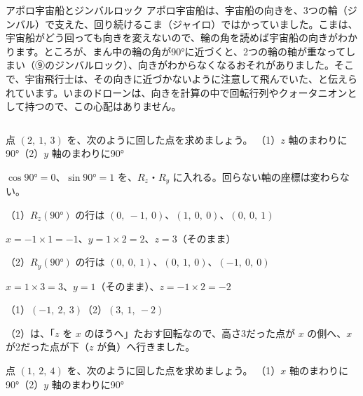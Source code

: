 \begin{column}{アポロ宇宙船とジンバルロック}
アポロ宇宙船は、宇宙船の向きを、3つの輪（ジンバル）で支えた、回り続けるこま（ジャイロ）ではかっていました。こまは、宇宙船がどう回っても向きを変えないので、輪の角を読めば宇宙船の向きがわかります。ところが、まん中の輪の角が90°に近づくと、2つの輪の軸が重なってしまい（⑨のジンバルロック）、向きがわからなくなるおそれがありました。そこで、宇宙飛行士は、その向きに近づかないように注意して飛んでいた、と伝えられています。いまのドローンは、向きを計算の中で回転行列やクォータニオンとして持つので、この心配はありません。
\end{column}


\begin{reidai}[軸のまわりに点を回す]
点 $(2,\ 1,\ 3)$ を、次のように回した点を求めましょう。\newline
（1）\nobreak $z$ 軸のまわりに90°\quad（2）\nobreak $y$ 軸のまわりに90°\par
\kangaekata $\cos90°=0$、$\sin90°=1$ を、$R_z$・$R_y$ に入れる。回らない軸の座標は変わらない。\par
\shiki （1）\nobreak $R_z(90°)$ の行は $(0,\ -1,\ 0)$、$(1,\ 0,\ 0)$、$(0,\ 0,\ 1)$\par
\kviihq \phantom{（1）}$x=-1\times1=-1$、$y=1\times2=2$、$z=3$（そのまま）\par
\kviihq （2）\nobreak $R_y(90°)$ の行は $(0,\ 0,\ 1)$、$(0,\ 1,\ 0)$、$(-1,\ 0,\ 0)$\par
\kviihq \phantom{（2）}$x=1\times3=3$、$y=1$（そのまま）、$z=-1\times2=-2$\par
\kotae （1）\nobreak $(-1,\ 2,\ 3)$\quad（2）\nobreak $(3,\ 1,\ -2)$
\end{reidai}
（2）は、「$z$ を $x$ のほうへ」たおす回転なので、高さ3だった点が $x$ の側へ、$x$ が2だった点が下（$z$ が負）へ行きました。

\begin{jibun}
点 $(1,\ 2,\ 4)$ を、次のように回した点を求めましょう。\newline
（1）\nobreak $x$ 軸のまわりに90°\quad（2）\nobreak $y$ 軸のまわりに90°
\end{jibun}

